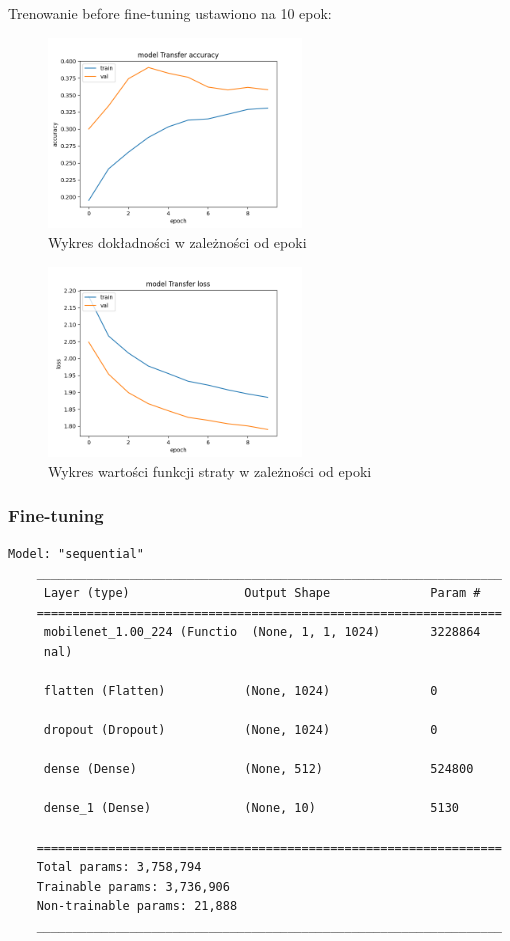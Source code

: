 \documentclass{article}
\begin{document}
Trenowanie before fine-tuning ustawiono na 10 epok:

\begin{figure}[H]
    \centering
    \includegraphics[width=0.6\textwidth]{../Saves/Transfer/mnist-784/Transfer_mnist_784_ep10_acc.png}
    \caption{Wykres dokładności w zależności od epoki}
\end{figure}

\begin{figure}[H]
    \centering
    \includegraphics[width=0.6\textwidth]{../Saves/Transfer/mnist-784/Transfer_mnist_784_ep10_loss.png}
    \caption{Wykres wartości funkcji straty w zależności od epoki}
\end{figure}

\subsubsection{Fine-tuning}

\begin{lstlisting}[style=siec]
    Model: "sequential"
    _________________________________________________________________
     Layer (type)                Output Shape              Param #
    =================================================================
     mobilenet_1.00_224 (Functio  (None, 1, 1, 1024)       3228864
     nal)

     flatten (Flatten)           (None, 1024)              0

     dropout (Dropout)           (None, 1024)              0

     dense (Dense)               (None, 512)               524800

     dense_1 (Dense)             (None, 10)                5130

    =================================================================
    Total params: 3,758,794
    Trainable params: 3,736,906
    Non-trainable params: 21,888
    _________________________________________________________________
\end{lstlisting}
\end{document}

